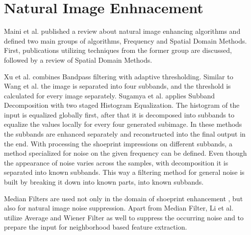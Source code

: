 \documentclass[draft,final]{vutinfth} %
\begin{document}


\section*{Natural Image Enhnacement}
\par
Maini et al. \cite{maini2010comprehensive} published a review about natural image enhancing algorithms and defined two main groups of algorithms, Frequency and Spatial Domain Methods.
First, publications utilizing techniques from the former group are discussed, followed by a review of Spatial Domain Methods. 
\par
Xu et al. \cite{xu2016image} combines Bandpass filtering with adaptive thresholding.
Similar to Wang et al. \cite{wang2014enhanced} the image is separated into four subbands, and the threshold is calculated for every image separately.
Sugamya et al. \cite{sugamya2016image} applies Subband Decomposition with two staged Histogram Equalization.
The histogram of the input is equalized globally first, after that it is decomposed into subbands to equalize the values locally for every four generated subimage.
In these methods the subbands are enhanced separately and reconstructed into the final output in the end.
With processing the shoeprint impressions on different subbands, a method specialized for noise on the given frequency can be defined.
Even though the appearance of noise varies across the samples, with decomposition it is separated into known subbands.
This way a filtering method for general noise is built by breaking it down into known parts, into known subbands.  
\par
Median Filters are used not only in the domain of shoeprint enhancement \cite{alizadeh2017automatic}, but also for natural image noise suppression.
Apart from Median Filter, Li et al. \cite{li2014rapid} utilize Average and Wiener Filter as well to suppress the occurring noise and to prepare the input for neighborhood based feature extraction.
\end{document}
